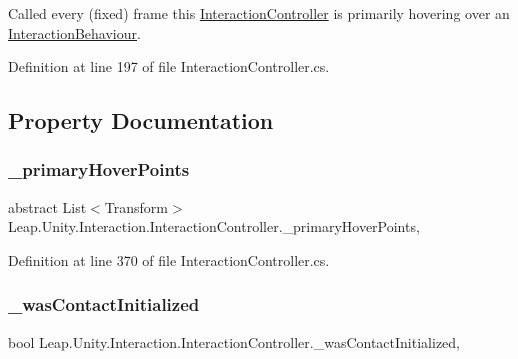 Called every (fixed) frame this \mbox{\hyperlink{class_leap_1_1_unity_1_1_interaction_1_1_interaction_controller}{Interaction\+Controller}} is primarily hovering over an \mbox{\hyperlink{class_leap_1_1_unity_1_1_interaction_1_1_interaction_behaviour}{Interaction\+Behaviour}}. 



Definition at line 197 of file Interaction\+Controller.\+cs.



\subsection{Property Documentation}
\mbox{\label{class_leap_1_1_unity_1_1_interaction_1_1_interaction_controller_a18c2955004efd717b06bc82eecae7698}} 
\subsubsection{\texorpdfstring{\_primaryHoverPoints}{\_primaryHoverPoints}}
{\footnotesize\ttfamily abstract List$<$Transform$>$ Leap.\+Unity.\+Interaction.\+Interaction\+Controller.\+\_\+primary\+Hover\+Points\hspace{0.3cm}{\ttfamily [get]}, {\ttfamily [protected]}}



Definition at line 370 of file Interaction\+Controller.\+cs.

\mbox{\label{class_leap_1_1_unity_1_1_interaction_1_1_interaction_controller_ad42f1bf4fa7ae05e23a3fbc314c6020f}} 
\subsubsection{\texorpdfstring{\_wasContactInitialized}{\_wasContactInitialized}}
{\footnotesize\ttfamily bool Leap.\+Unity.\+Interaction.\+Interaction\+Controller.\+\_\+was\+Contact\+Initialized\hspace{0.3cm}{\ttfamily [get]}, {\ttfamily [protected]}}



